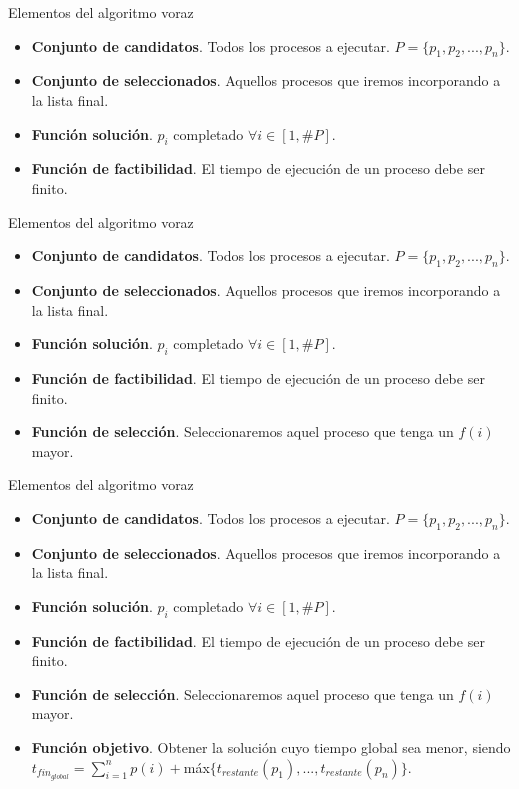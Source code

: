 \documentclass{beamer}
\begin{document}
\begin{frame}[fragile]{Elementos del algoritmo voraz}
\begin{itemize}
	\item \textbf{Conjunto de candidatos}. Todos los procesos a ejecutar. $P=\{p_1, p_2, ..., p_n\}$.
	\item \textbf{Conjunto de seleccionados}. Aquellos procesos que iremos incorporando a la lista final.
	\item \textbf{Función solución}. $p_i$ completado $\forall i \in [1,\#P]$.
	\item \textbf{Función de factibilidad}. El tiempo de ejecución de un proceso debe ser finito.
\end{itemize}
\end{frame}

\begin{frame}[fragile]{Elementos del algoritmo voraz}
\begin{itemize}
	\item \textbf{Conjunto de candidatos}. Todos los procesos a ejecutar. $P=\{p_1, p_2, ..., p_n\}$.
	\item \textbf{Conjunto de seleccionados}. Aquellos procesos que iremos incorporando a la lista final.
	\item \textbf{Función solución}. $p_i$ completado $\forall i \in [1,\#P]$.
	\item \textbf{Función de factibilidad}. El tiempo de ejecución de un proceso debe ser finito.
	\item \textbf{Función de selección}. Seleccionaremos aquel proceso que tenga un $f(i)$ mayor.
\end{itemize}
\end{frame}

\begin{frame}[fragile]{Elementos del algoritmo voraz}
\begin{itemize}
	\item \textbf{Conjunto de candidatos}. Todos los procesos a ejecutar. $P=\{p_1, p_2, ..., p_n\}$.
	\item \textbf{Conjunto de seleccionados}. Aquellos procesos que iremos incorporando a la lista final.
	\item \textbf{Función solución}. $p_i$ completado $\forall i \in [1,\#P]$.
	\item \textbf{Función de factibilidad}. El tiempo de ejecución de un proceso debe ser finito.
	\item \textbf{Función de selección}. Seleccionaremos aquel proceso que tenga un $f(i)$ mayor.
	\item \textbf{Función objetivo}. Obtener la solución cuyo tiempo global sea menor, siendo $t_{fin_{global}} = \sum_{i=1}^{n} p(i) + $máx$\{t_{restante}(p_1),...,t_{restante}(p_n)\}$.
\end{itemize}
\end{frame}
\end{document}
